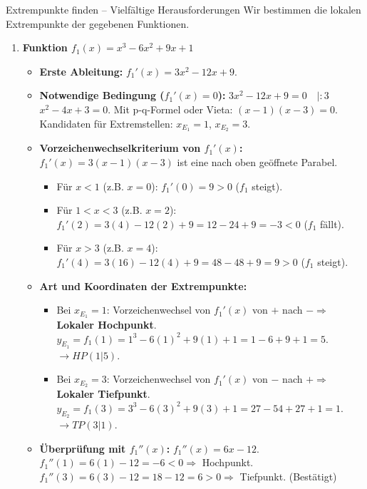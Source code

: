 \begin{loesungsumgebung}{Extrempunkte finden – Vielfältige Herausforderungen}
Wir bestimmen die lokalen Extrempunkte der gegebenen Funktionen.

\begin{enumerate}[label=(\alph*)]
    \item \textbf{Funktion $f_1(x) = x^3 - 6x^2 + 9x + 1$}
    \begin{itemize}
        \item \textbf{Erste Ableitung:} $f_1'(x) = 3x^2 - 12x + 9$.
        \item \textbf{Notwendige Bedingung ($f_1'(x)=0$):}
        $3x^2 - 12x + 9 = 0 \quad | :3$
        $x^2 - 4x + 3 = 0$.
        Mit p-q-Formel oder Vieta: $(x-1)(x-3)=0$.
        Kandidaten für Extremstellen: $x_E_1 = 1$, $x_E_2 = 3$.
        \item \textbf{Vorzeichenwechselkriterium von $f_1'(x)$:}
        $f_1'(x) = 3(x-1)(x-3)$ ist eine nach oben geöffnete Parabel.
        \begin{itemize}
            \item Für $x < 1$ (z.B. $x=0$): $f_1'(0) = 9 > 0$ ($f_1$ steigt).
            \item Für $1 < x < 3$ (z.B. $x=2$): $f_1'(2) = 3(4)-12(2)+9 = 12-24+9 = -3 < 0$ ($f_1$ fällt).
            \item Für $x > 3$ (z.B. $x=4$): $f_1'(4) = 3(16)-12(4)+9 = 48-48+9 = 9 > 0$ ($f_1$ steigt).
        \end{itemize}
        \item \textbf{Art und Koordinaten der Extrempunkte:}
        \begin{itemize}
            \item Bei $x_E_1 = 1$: Vorzeichenwechsel von $f_1'(x)$ von $+$ nach $- \Rightarrow$ \textbf{Lokaler Hochpunkt}.
            $y_E_1 = f_1(1) = 1^3 - 6(1)^2 + 9(1) + 1 = 1-6+9+1 = 5$.
            $\rightarrow HP(1|5)$.
            \item Bei $x_E_2 = 3$: Vorzeichenwechsel von $f_1'(x)$ von $-$ nach $+ \Rightarrow$ \textbf{Lokaler Tiefpunkt}.
            $y_E_2 = f_1(3) = 3^3 - 6(3)^2 + 9(3) + 1 = 27 - 54 + 27 + 1 = 1$.
            $\rightarrow TP(3|1)$.
        \end{itemize}
        \item \textbf{Überprüfung mit $f_1''(x)$:}
        $f_1''(x) = 6x - 12$.
        $f_1''(1) = 6(1)-12 = -6 < 0 \Rightarrow$ Hochpunkt.
        $f_1''(3) = 6(3)-12 = 18-12 = 6 > 0 \Rightarrow$ Tiefpunkt. (Bestätigt)
    \end{itemize}


\end{enumerate}
\end{loesungsumgebung}
